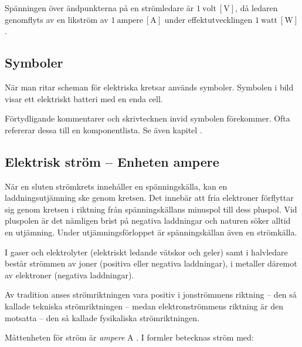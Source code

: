 Spänningen över ändpunkterna på en strömledare är \(1\ \mathrm{volt\ [V]}\), då
ledaren genomflyts av en likström av \(1\ \mathrm{ampere\ [A]}\) under
effektutvecklingen \(1\ \mathrm{watt\ [W]}\).

\subsection{Symboler}
\label{spänning.symboler}

När man ritar scheman för elektriska kretsar används symboler.
Symbolen i bild  visar ett elektriskt batteri med en
enda cell.



Förtydligande kommentarer och skrivtecknen invid symbolen förekommer.
Ofta refererar dessa till en komponentlista.
Se även kapitel .

\subsection{Elektrisk ström -- Enheten ampere}
\label{elektrisk_ström}

När en sluten strömkrets innehåller en spänningskälla, kan en
laddningsutjämning ske genom kretsen.
Det innebär att fria elektroner förflyttar sig genom kretsen i riktning från
spänningskällans minuspol till dess pluspol.
Vid pluspolen är det nämligen brist på negativa laddningar och naturen söker
alltid en utjämning.
Under utjämningsförloppet är spänningskällan även en strömkälla.

I gaser och elektrolyter (elektriskt ledande vätskor och geler) samt i
halvledare består strömmen av joner (positiva eller negativa laddningar),
i metaller däremot av elektroner (negativa laddningar).

Av tradition anses strömriktningen vara positiv i jonströmmens riktning -- den
så kallade tekniska strömriktningen -- medan elektronströmmens riktning är den
motsatta -- den så kallade fysikaliska strömriktningen.

Måttenheten för ström är \emph{ampere} \(\mathrm{A}\) \cite{SIbrochure8}.
I formler betecknas ström med:

